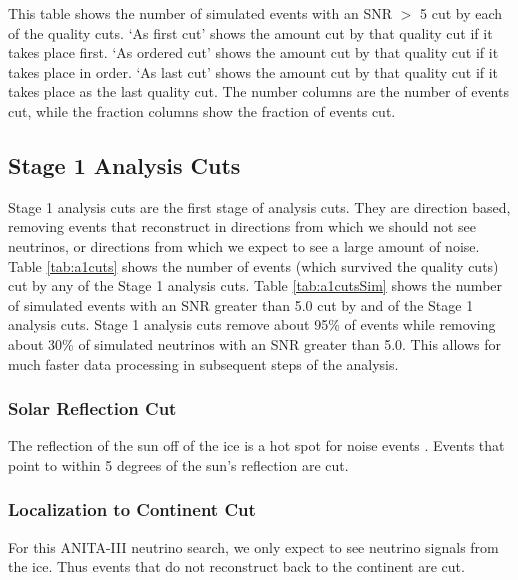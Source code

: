 \begin{table}[h]
\centering
{}
\caption[Quality Cuts Table for Simulated Events]{This table shows the number of simulated events with an SNR $>$ 5 cut by each of the quality cuts.  `As first cut' shows the amount cut by that quality cut if it takes place first.  `As ordered cut' shows the amount cut by that quality cut if it takes place in order.  `As last cut' shows the amount cut by that quality cut if it takes place as the last quality cut.  The number columns are the number of events cut, while the fraction columns show the fraction of events cut.}
\label{tab:qcutsSim}
\end{table}

\subsection{Stage 1 Analysis Cuts}

Stage 1 analysis cuts are the first stage of analysis cuts.  They are direction based, removing events that reconstruct in directions from which we should not see neutrinos, or directions from which we expect to see a large amount of noise.  Table \ref{tab:a1cuts} shows the number of events (which survived the quality cuts) cut by any of the Stage 1 analysis cuts.  Table \ref{tab:a1cutsSim} shows the number of simulated events with an SNR greater than 5.0 cut by and of the Stage 1 analysis cuts.  Stage 1 analysis cuts remove about 95\% of events while removing about 30\% of simulated neutrinos with an SNR greater than 5.0.  This allows for much faster data processing in subsequent steps of the analysis.

\subsubsection{Solar Reflection Cut}

The reflection of the sun off of the ice is a hot spot for noise events \cite{sam}.  Events that point to within 5 degrees of the sun's reflection are cut.

\subsubsection{Localization to Continent Cut}

For this ANITA-III neutrino search, we only expect to see neutrino signals from the ice.  Thus events that do not reconstruct back to the continent are cut. 

